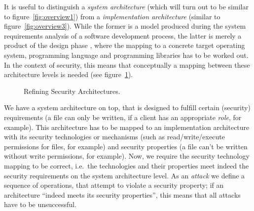 It is useful to distinguish a \emph{system
  architecture} (which will turn out to be
similar to figure~\ref{fig:overview1}) from a \emph{implementation
  architecture} (similar to
figure~\ref{fig:overview3}).  While the former is a model produced
during the system requirements analysis of a software development
process, the latter is merely a product of the design phase
\cite{brohl.ea:vmodell:1995, kruchten:rup:1998}, where the mapping to
a concrete target operating system, programming language and
programming libraries has to be worked out. In the context of
security, this means that conceptually a mapping between these
architecture levels is needed (see figure~\ref{fig:refsec1}).
\begin{figure}
    \center
    \caption{Refining Security Architectures.\label{fig:refsec1}}
\end{figure}
We have a system architecture on top, that is designed to fulfill
certain (security) requirements (a file can only be written, if a
client has an appropriate \emph{role}, for example). This
architecture has to be mapped to an implementation architecture with
its security technologies or mechanisms (such as read/write/execute
permissions for files, for example) and security properties (a file
can't be written without write permissions, for example).  Now, we
require the security technology mapping to be correct, i.e.\ the
technologies and their properties meet indeed the security
requirements on the system architecture level.  As an
\emph{attack} we define a sequence of operations, that
attempt to violate a security property; if an architecture ``indeed
meets its security properties'', this means that all attacks have to
be unsuccessful.
  
